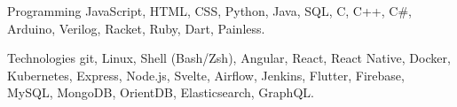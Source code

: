 

\begin{cvskills}

  \cvskill
    {Programming} %
    {JavaScript, HTML, CSS, Python, Java, SQL, C, C++, C\#,  Arduino, Verilog, Racket, Ruby, Dart, Painless.} %

  \cvskill
    {Technologies} %
    {git, Linux, Shell (Bash/Zsh), Angular, React, React Native, Docker, Kubernetes, Express, Node.js, Svelte, Airflow, Jenkins, Flutter, Firebase, MySQL, MongoDB, OrientDB, Elasticsearch, GraphQL.} %


\end{cvskills}
